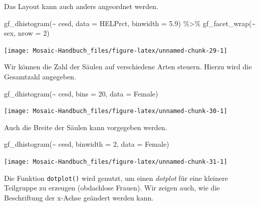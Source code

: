 \documentclass[
  ngerman,
]{scrbook}
\newenvironment{Shaded}{\begin{snugshade}}{\end{snugshade}}
\newcommand{\AttributeTok}[1]{\textcolor[rgb]{0.77,0.63,0.00}{#1}}
\newcommand{\DecValTok}[1]{\textcolor[rgb]{0.00,0.00,0.81}{#1}}
\newcommand{\FloatTok}[1]{\textcolor[rgb]{0.00,0.00,0.81}{#1}}
\newcommand{\FunctionTok}[1]{\textcolor[rgb]{0.00,0.00,0.00}{#1}}
\newcommand{\NormalTok}[1]{#1}
\newcommand{\SpecialCharTok}[1]{\textcolor[rgb]{0.00,0.00,0.00}{#1}}
\begin{document}
Das Layout kann auch anders angeordnet werden.

\begin{Shaded}
\begin{Highlighting}[]
\FunctionTok{gf\_dhistogram}\NormalTok{(}\SpecialCharTok{\textasciitilde{}}\NormalTok{ cesd, }\AttributeTok{data =}\NormalTok{ HELPrct, }\AttributeTok{binwidth =} \FloatTok{5.9}\NormalTok{) }\SpecialCharTok{\%\textgreater{}\%}
\FunctionTok{gf\_facet\_wrap}\NormalTok{(}\SpecialCharTok{\textasciitilde{}}\NormalTok{ sex, }\AttributeTok{nrow =} \DecValTok{2}\NormalTok{)}
\end{Highlighting}
\end{Shaded}

\begin{center}\texttt{[image: Mosaic-Handbuch\_files/figure-latex/unnamed-chunk-29-1]} \end{center}

Wir können die Zahl der Säulen auf verschiedene Arten steuern. Hierzu wird die Gesamtzahl angegeben.

\begin{Shaded}
\begin{Highlighting}[]
\FunctionTok{gf\_dhistogram}\NormalTok{(}\SpecialCharTok{\textasciitilde{}}\NormalTok{ cesd, }\AttributeTok{bins =} \DecValTok{20}\NormalTok{, }\AttributeTok{data =}\NormalTok{ Female)}
\end{Highlighting}
\end{Shaded}

\begin{center}\texttt{[image: Mosaic-Handbuch\_files/figure-latex/unnamed-chunk-30-1]} \end{center}

Auch die Breite der Säulen kann vorgegeben werden.

\begin{Shaded}
\begin{Highlighting}[]
\FunctionTok{gf\_dhistogram}\NormalTok{(}\SpecialCharTok{\textasciitilde{}}\NormalTok{ cesd, }\AttributeTok{binwidth =} \DecValTok{2}\NormalTok{, }\AttributeTok{data =}\NormalTok{ Female)}
\end{Highlighting}
\end{Shaded}

\begin{center}\texttt{[image: Mosaic-Handbuch\_files/figure-latex/unnamed-chunk-31-1]} \end{center}

Die Funktion \texttt{dotplot()} wird genutzt, um einen \emph{dotplot} für eine kleinere Teilgruppe zu erzeugen (obdachlose Frauen). Wir zeigen auch, wie die Beschriftung der x-Achse geändert werden kann.
\end{document}
